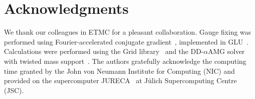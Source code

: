 \section*{Acknowledgments}
We thank our colleagues in ETMC for a pleasant collaboration.
Gauge fixing was performed using
Fourier-accelerated conjugate gradient~\cite{Hudspith:2014oja},
implemented in GLU~\cite{GLU}. Calculations were performed using the
Grid library~\cite{Boyle:2016lbp} and the DD-$\alpha$AMG
solver~\cite{Frommer:2013fsa} with twisted mass
support~\cite{Alexandrou:2016izb}. The authors gratefully
acknowledge the computing time granted by the John von Neumann
Institute for Computing (NIC) and provided on the supercomputer
JURECA~\cite{jureca} at J\"ulich Supercomputing Centre (JSC).

